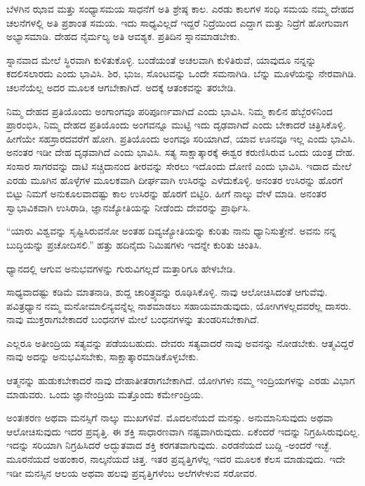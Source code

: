 ಬೆಳಗಿನ ಝಾವ ಮತ್ತು ಸಂಧ್ಯಾಸಮಯ ಸಾಧನೆಗೆ ಅತಿ ಶ್ರೇಷ್ಠ ಕಾಲ. ಎರಡು ಕಾಲಗಳ ಸಂಧಿ ಸಮಯ ನಮ್ಮ ದೇಹದ ಚಲನೆಗಳಲ್ಲಿ ಅತಿ ಪ್ರಶಾಂತ ಸಮಯ. ಇದು ಸಾಧ್ಯವಿಲ್ಲದೆ ಇದ್ದರೆ ನಿದ್ರೆಯಿಂದ ಎದ್ದಾಗ ಮತ್ತು ನಿದ್ರೆಗೆ ಹೋಗುವಾಗ ಅಭ್ಯಾಸಮಾಡಿ. ದೇಹದ ನೈರ್ಮಲ್ಯ ಅತಿ ಆವಶ್ಯಕ. ಪ್ರತಿದಿನ ಸ್ನಾನಮಾಡಬೇಕು.

ಸ್ನಾನವಾದ ಮೇಲೆ ಸ್ಥಿರವಾಗಿ ಕುಳಿತುಕೊಳ್ಳಿ. ಬಂಡೆಯಂತೆ ಅಚಲವಾಗಿ ಕುಳಿತಿರುವೆ, ಯಾವುದೂ ನನ್ನನ್ನು ಕದಲಿಸಲಾರದು ಎಂದು ಭಾವಿಸಿ. ಶಿರ, ಭುಜ, ಸೊಂಟವನ್ನು ಒಂದೇ ಸಮನಾಗಿಡಿ. ಬೆನ್ನು ಮೂಳೆಯನ್ನು ನೇರವಾಗಿಡಿ. ಚಲನೆಯೆಲ್ಲ ಅದರ ಮೂಲಕ ಆಗಬೇಕಾಗಿದೆ. ಅದಕ್ಕೆ ಆತಂಕವನ್ನು ತರಬೇಡಿ.

ನಿಮ್ಮ ದೇಹದ ಪ್ರತಿಯೊಂದು ಅಂಗಾಂಗವೂ ಪರಿಪೂರ್ಣವಾಗಿದೆ ಎಂದು ಭಾವಿಸಿ. ನಿಮ್ಮ ಕಾಲಿನ ಹೆಬ್ಬೆರಳಿನಿಂದ ಪ್ರಾರಂಭಿಸಿ, ನಿಮ್ಮ ದೇಹದ ಪ್ರತಿಯೊಂದು ಅಂಗವನ್ನೂ ಮುಟ್ಟಿ ಇದು ದೃಢವಾಗಿದೆ ಎಂದು ಬೇಕಾದರೆ ಚಿತ್ರಿಸಿಕೊಳ್ಳಿ. ಹೀಗೆಯೇ ಸಹಸ್ರಾರದವರೆಗೆ ಹೋಗಿ. ಪ್ರತಿಯೊಂದು ಅಂಗವೂ ಸರಿಯಾಗಿದೆ, ಯಾವ ಊನವೂ ಇಲ್ಲ ಎಂದು ಭಾವಿಸಿ. ಅನಂತರ ಇಡೀ ದೇಹ ದೃಢವಾಗಿದೆ ಎಂದು ಭಾವಿಸಿ. ಸತ್ಯ ಸಾಕ್ಷಾತ್ಕಾರಕ್ಕೆ ಈಶ್ವರ ಕರುಣಿಸಿರುವ ಒಂದು ಯಂತ್ರ ದೇಹ. ಸಂಸಾರ ಸಾಗರವನ್ನು ದಾಟಿ ಸಚ್ಚಿದಾನಂದ ತೀರವನ್ನು ಸೇರಲು ಇದೊಂದು ದೋಣಿ ಎಂದು ಭಾವಿಸಿ. ಇದಾದ ಮೇಲೆ ಎರಡು ಮೂಗಿನ ಹೊಳ್ಳೆಗಳ ಮೂಲಕವಾಗಿ ದೀರ್ಘವಾಗಿ ಉಸಿರನ್ನು ಎಳೆದುಕೊಳ್ಳಿ. ಅನಂತರ ಉಸಿರನ್ನು ಹೊರಗೆ ಬಿಟ್ಟು ನಿಮಗೆ ಅನುಕೂಲವಾದಷ್ಟು ಕಾಲ ಉಸಿರನ್ನು ಹೊರಗೆ ಬಿಟ್ಟಿರಿ. ಹೀಗೆ ನಾಲ್ಕು ವೇಳೆ ಮಾಡಿ. ಅನಂತರ ಸ್ವಾಭಾವಿಕವಾಗಿ ಉಸಿರಾಡಿ, ಜ್ಞಾನಜ್ಯೋತಿಯನ್ನು ನೀಡೆಂದು ದೇವರನ್ನು ಪ್ರಾರ್ಥಿಸಿ.

“ಯಾರು ವಿಶ್ವವನ್ನು ಸೃಷ್ಟಿಸಿರುವನೋ ಅಂತಹ ದಿವ್ಯಜ್ಯೋತಿಯನ್ನು ಕುರಿತು ನಾನು ಧ್ಯಾನಿಸುತ್ತೇನೆ. ಅವನು ನನ್ನ ಬುದ್ಧಿಯನ್ನು ಪ್ರಚೋದಿಸಲಿ.'' ಹತ್ತು ಹದಿನೈದು ನಿಮಿಷಗಳು ಇದನ್ನೇ ಕುರಿತು ಚಿಂತಿಸಿ.

ಧ್ಯಾನದಲ್ಲಿ ಆಗುವ ಅನುಭವಗಳನ್ನು ಗುರುವಿಗಲ್ಲದೆ ಮತ್ತಾರಿಗೂ ಹೇಳಬೇಡಿ.

ಸಾಧ್ಯವಾದಷ್ಟು ಕಡಿಮೆ ಮಾತನಾಡಿ, ಶುದ್ದ ಚಾರಿತ್ರ್ಯವನ್ನು ರೂಢಿಸಿಕೊಳ್ಳಿ. ನಾವು ಆಲೋಚಿಸಿದಂತೆ ಆಗುವೆವು. ಪವಿತ್ರಧ್ಯಾನ ನಮ್ಮ ಮನೋಮಾಲಿನ್ಯವನ್ನೆಲ್ಲ ನಾಶಮಾಡಲು ಸಹಾಯಮಾಡುವುದು, ಯೋಗಿಗಳಲ್ಲದವರೆಲ್ಲ ದಾಸರು. ನಾವು ಮುಕ್ತರಾಗಬೇಕಾದರೆ ಬಂಧನಗಳ ಮೇಲೆ ಬಂಧನಗಳನ್ನು ತುಂಡರಿಸಬೇಕಾಗಿದೆ.

ಎಲ್ಲರೂ ಅತೀಂದ್ರಿಯ ಸತ್ಯವನ್ನು ಪಡೆಯಬಹುದು. ದೇವರು ಸತ್ಯವಾದರೆ ನಾವು ಅವನನ್ನು ನೋಡಬೇಕು. ಆತ್ಮವಿದ್ದರೆ ನಾವು ಅದನ್ನು ಅನುಭವಿಸಬೇಕು, ಸಾಕ್ಷಾತ್ಕಾರಮಾಡಿಕೊಳ್ಳಬೇಕು.

ಆತ್ಮನನ್ನು ಹುಡುಕಬೇಕಾದರೆ ನಾವು ದೇಹಾತೀತರಾಗಬೇಕಾಗಿದೆ. ಯೋಗಿಗಳು ನಮ್ಮ ಇಂದ್ರಿಯಗಳನ್ನು ಎರಡು ವಿಭಾಗ ಮಾಡುವರು. ಒಂದು ಜ್ಞಾನೇಂದ್ರಿಯ ಮತ್ತೊಂದು ಕರ್ಮೇಂದ್ರಿಯ.

ಅಂತಃಕರಣ ಅಥವಾ ಮನಸ್ಸಿಗೆ ನಾಲ್ಕು ಮುಖಗಳಿವೆ. ಮೊದಲನೆಯದೆ ಮನಸ್ಸು. ಅನುಮಾನಿಸುವುದು ಅಥವಾ ಆಲೋಚಿಸುವುದು ಇದರ ಪ್ರವೃತ್ತಿ. ಈ ಶಕ್ತಿ ಸಾಧಾರಣವಾಗಿ ನಷ್ಟವಾಗಿರುವುದು. ಏಕೆಂದರೆ ಇದನ್ನು ನಿಗ್ರಹಿಸಿರುವುದಿಲ್ಲ. ಇದನ್ನು ಸರಿಯಾಗಿ ನಿಗ್ರಹಿಸಿದರೆ ಅದ್ಭುತವಾದ ಶಕ್ತಿ ಕರಗತವಾಗುವುದು. ಎರಡನೆಯದೆ ಬುದ್ದಿ -ಅಂದರೆ ಇಚ್ಛೆ. ಮೂರನೆಯದೆ ಅಹಂಕಾರ, ನಾಲ್ಕನೆಯದೆ ಚಿತ್ತ. ಇತರ ಪ್ರವೃತ್ತಿಗಳೆಲ್ಲ ಇದರ ಮೂಲಕ ಕೆಲಸ ಮಾಡುವುದು. ಇದೇ ಇಡೀ ಮನಸ್ಸಿನ ಆಲಯ ಅಥವಾ ಹಲವು ಪ್ರವೃತ್ತಿಗಳೆಂಬ ಅಲೆಗಳೇಳುವ ಸರೋವರ.

